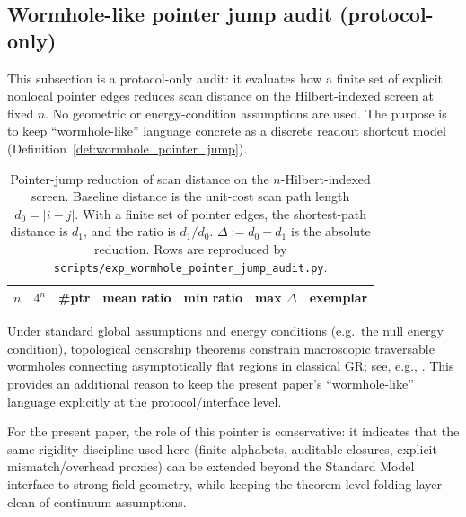 \subsection{Wormhole-like pointer jump audit (protocol-only)}
\label{app:wormhole_pointer_jump_audit}

\AuditTag This subsection is a protocol-only audit: it evaluates how a finite set of explicit nonlocal pointer edges reduces scan distance on the Hilbert-indexed screen at fixed $n$.
No geometric or energy-condition assumptions are used.
The purpose is to keep ``wormhole-like'' language concrete as a discrete readout shortcut model (Definition~\ref{def:wormhole_pointer_jump}).

\begin{table}[h]
\centering
\scriptsize
\setlength{\tabcolsep}{6pt}
\renewcommand{\arraystretch}{1.15}
\begin{tabular}{r r r r r r l}
\toprule
$n$ & $4^n$ & \#ptr & mean ratio & min ratio & max $\Delta$ & exemplar \\
\midrule
%
\end{tabular}
\caption{Pointer-jump reduction of scan distance on the $n$-Hilbert-indexed screen. Baseline distance is the unit-cost scan path length $d_0=|i-j|$. With a finite set of pointer edges, the shortest-path distance is $d_1$, and the ratio is $d_1/d_0$. $\Delta:=d_0-d_1$ is the absolute reduction. Rows are reproduced by \texttt{scripts/exp\_wormhole\_pointer\_jump\_audit.py}.}
\end{table}



\begin{remark}
Under standard global assumptions and energy conditions (e.g.\ the null energy condition), topological censorship theorems constrain macroscopic traversable wormholes connecting asymptotically flat regions in classical GR; see, e.g., \cite{FriedmanSchleichWitt1993,Galloway1999TopologicalCensorship}.
This provides an additional reason to keep the present paper's ``wormhole-like'' language explicitly at the protocol/interface level.
\end{remark}

For the present paper, the role of this pointer is conservative: it indicates that the same rigidity discipline used here (finite alphabets, auditable closures, explicit mismatch/overhead proxies) can be extended beyond the Standard Model interface to strong-field geometry, while keeping the theorem-level folding layer clean of continuum assumptions.



